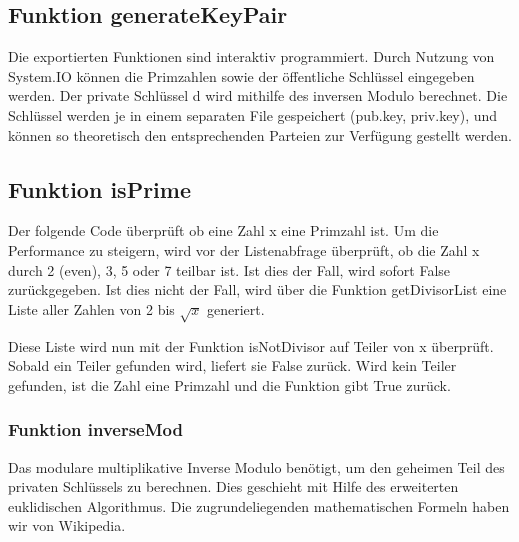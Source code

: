 \documentclass[a4paper, 11pt]{article} %
\begin{document}
\subsection{Funktion generateKeyPair}
Die exportierten Funktionen sind interaktiv programmiert. Durch Nutzung von System.IO können die Primzahlen sowie der öffentliche Schlüssel eingegeben werden. Der private Schlüssel d wird mithilfe des inversen Modulo berechnet.
Die Schlüssel werden je in einem separaten File gespeichert (pub.key, priv.key), und können so theoretisch den entsprechenden Parteien zur Verfügung gestellt werden.




\subsection{Funktion isPrime}
Der folgende Code überprüft ob eine Zahl x eine Primzahl ist. Um die Performance zu steigern, wird vor der Listenabfrage überprüft, ob die Zahl x durch 2 (even), 3, 5 oder 7 teilbar ist. Ist dies der Fall, wird sofort False zurückgegeben.
Ist dies nicht der Fall, wird über die Funktion getDivisorList eine Liste aller Zahlen von 2 bis $\sqrt{x}$ generiert.

Diese Liste wird nun mit der Funktion isNotDivisor auf Teiler von x überprüft. Sobald ein Teiler gefunden wird, liefert sie False zurück. Wird kein Teiler gefunden, ist die Zahl eine Primzahl und die Funktion gibt True zurück.


\subsubsection{Funktion inverseMod}
Das modulare multiplikative Inverse Modulo benötigt, um den geheimen Teil des privaten Schlüssels zu berechnen. Dies geschieht mit Hilfe des erweiterten euklidischen Algorithmus. Die zugrundeliegenden mathematischen Formeln haben wir von Wikipedia.

\end{document}
